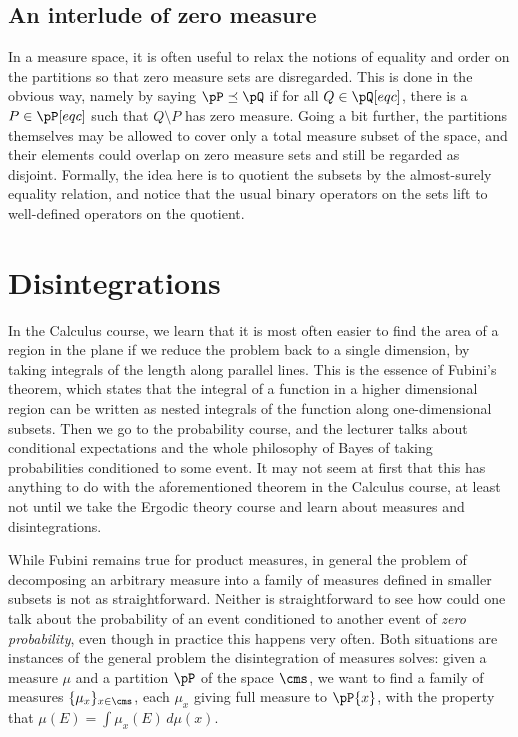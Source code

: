 \documentclass[../main]{subfiles}
\begin{document}
\subsection{An interlude of zero measure}
In a measure space, it is often useful to relax the notions of equality and order on the partitions so that zero measure sets are disregarded. This is done in the obvious way, namely by saying \(\pP \preceq \pQ\) if for all \(Q \in \pQ[eqc]\), there is a \(P \in \pP[eqc]\) such that \(Q \setminus P\) has zero measure. Going a bit further, the partitions themselves may be allowed to cover only a total measure subset of the space, and their elements could overlap on zero measure sets and still be regarded as disjoint. Formally, the idea here is to quotient the subsets by the almost-surely equality relation, and notice that the usual binary operators on the sets lift to well-defined operators on the quotient.

\section{Disintegrations}

In the Calculus  course, we learn that it is most often easier to find the area of a region in the plane if we reduce the problem back to a single dimension, by taking integrals of the length along parallel lines. This is the essence of Fubini's theorem, which states that the integral of a function in a higher dimensional region can be written as nested integrals of the function along one-dimensional subsets.
Then we go to the probability course, and the lecturer talks about conditional expectations and the whole philosophy of Bayes of taking probabilities conditioned to some event. It may not seem at first that this has anything to do with the aforementioned theorem in the Calculus course, at least not until we take the Ergodic theory course and learn about measures and disintegrations.

While Fubini remains true for product measures, in general the problem of decomposing an arbitrary measure into a family of measures defined in smaller subsets is not as straightforward. Neither is straightforward to see how could one talk about the probability of an event conditioned to another event of \emph{zero probability}, even though in practice this happens very often. 
Both situations are instances of the general problem the disintegration of measures solves: given a measure \(\mu\) and a partition \(\pP\) of the space \(\cms\), we want to find a family of measures \(\{\mu_x\}_{x \in \cms}\), each \(\mu_x\) giving full measure to \(\pP{x}\), with the property that \(\mu(E) = \int \mu_x(E) \,d\mu (x)\).
\end{document}
